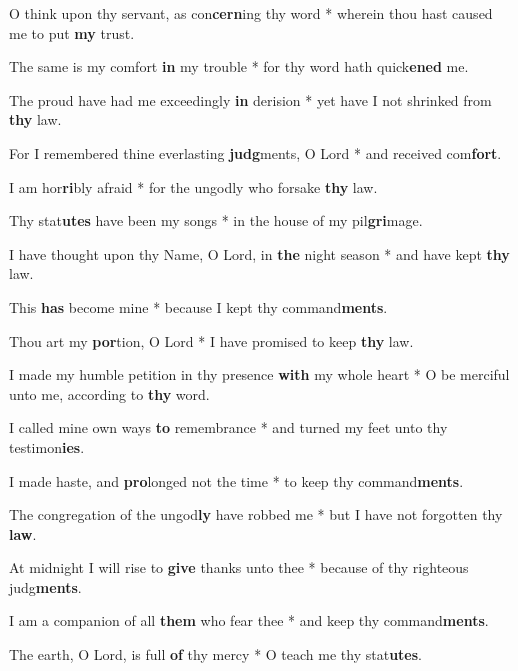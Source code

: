 \begin{multicols}{2}
	O think upon thy servant, as con\textbf{cern}ing thy word * wherein thou hast caused me to put \textbf{my} trust.
	
	The same is my comfort \textbf{in} my trouble * for thy word hath quick\textbf{ened} me.
	
	The proud have had me exceedingly \textbf{in} derision * yet have I not shrinked from \textbf{thy} law.
	
	For I remembered thine everlasting \textbf{judg}ments, O Lord * and received com\textbf{fort}.
	
	I am hor\textbf{ri}bly afraid * for the ungodly who forsake \textbf{thy} law.
	
	Thy stat\textbf{utes} have been my songs * in the house of my pil\textbf{gri}mage.
	
	I have thought upon thy Name, O Lord, in \textbf{the} night season * and have kept \textbf{thy} law.
	
	This \textbf{has} become mine * because I kept thy command\textbf{ments}.
	
	Thou art my \textbf{por}tion, O Lord * I have promised to keep \textbf{thy} law.
	
	I made my humble petition in thy presence \textbf{with} my whole heart * O be merciful unto me, according to \textbf{thy} word.
	
	I called mine own ways \textbf{to} remembrance * and turned my feet unto thy testimon\textbf{ies}.
	
	I made haste, and \textbf{pro}longed not the time * to keep thy command\textbf{ments}.
	
	The congregation of the ungod\textbf{ly} have robbed me * but I have not forgotten thy \textbf{law}.
	
	At midnight I will rise to \textbf{give} thanks unto thee * because of thy righteous judg\textbf{ments}.
	
	I am a companion of all \textbf{them} who fear thee * and keep thy command\textbf{ments}.
	
	The earth, O Lord, is full \textbf{of} thy mercy * O teach me thy stat\textbf{utes}.
\end{multicols}